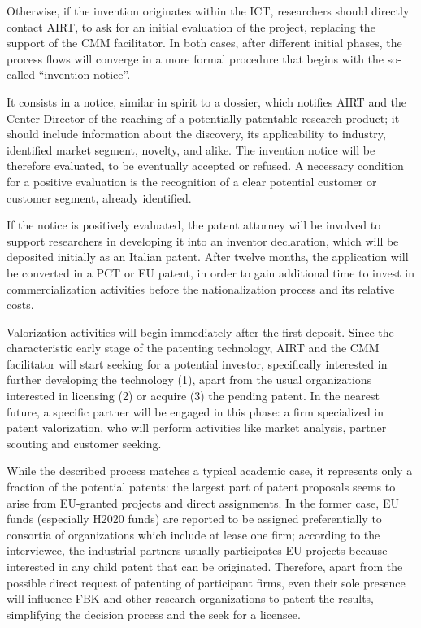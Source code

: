 Otherwise, if the invention originates within the ICT, researchers should directly contact AIRT, to ask for an initial evaluation of the project, replacing the support of the CMM facilitator. In both cases, after different initial phases, the process flows will converge in a more formal procedure that begins with the so-called \enquote{invention notice}. 

It consists in a notice, similar in spirit to a dossier, which notifies AIRT and the Center Director of the reaching of a potentially patentable research product; it should include information about the discovery, its applicability to industry, identified market segment, novelty, and alike. The invention notice will be therefore evaluated, to be eventually accepted or refused. A necessary condition for a positive evaluation is the recognition of a clear potential customer or customer segment, already identified.

If the notice is positively evaluated, the patent attorney will be involved to support researchers in developing it into an inventor declaration, which will be deposited initially as an Italian patent. After twelve months, the application will be converted in a PCT or EU patent, in order to gain additional time to invest in commercialization activities before the nationalization process and its relative costs.

Valorization activities will begin immediately after the first deposit. Since the characteristic early stage of the patenting technology, AIRT and the CMM facilitator will start seeking for a potential investor, specifically interested in further developing the technology (1), apart from the usual organizations interested in licensing (2) or acquire (3) the pending patent. In the nearest future, a specific partner will be engaged in this phase: a firm specialized in patent valorization, who will perform activities like market analysis, partner scouting and customer seeking. 

While the described process matches a typical academic case, it represents only a fraction of the potential patents: the largest part of patent proposals seems to arise from EU-granted projects and direct assignments. In the former case, EU funds (especially H2020 funds) are reported to be assigned preferentially to consortia of organizations which include at lease one firm; according to the interviewee, the industrial partners usually participates EU projects because interested in any child patent that can be originated. Therefore, apart from the possible direct request of patenting of participant firms, even their sole presence will influence FBK and other research organizations to patent the results, simplifying the decision process and the seek for a licensee. 

